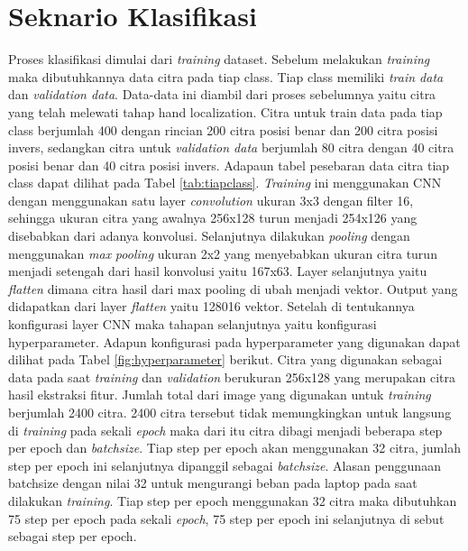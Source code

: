 \section{Seknario Klasifikasi}
Proses klasifikasi dimulai dari \emph{training} dataset. Sebelum melakukan \emph{training} maka dibutuhkannya data citra pada tiap class. Tiap class memiliki \emph{train data} dan \emph{validation data}. Data-data ini diambil dari proses sebelumnya yaitu citra yang telah melewati tahap hand localization. Citra untuk train data pada tiap class berjumlah 400 dengan rincian 200 citra posisi benar dan 200 citra posisi invers, sedangkan citra untuk \emph{validation data} berjumlah 80 citra dengan 40 citra posisi benar dan 40 citra posisi invers. Adapaun tabel pesebaran data citra tiap class dapat dilihat pada Tabel \ref{tab:tiapclass}. \emph{Training} ini menggunakan CNN dengan menggunakan satu layer \emph{convolution} ukuran 3x3 dengan filter 16, sehingga ukuran citra yang awalnya 256x128 turun menjadi 254x126 yang disebabkan dari adanya konvolusi. Selanjutnya dilakukan \emph{pooling} dengan menggunakan \emph{max} \emph{pooling} ukuran 2x2 yang menyebabkan ukuran citra turun menjadi setengah dari hasil konvolusi yaitu 167x63. Layer selanjutnya yaitu \emph{flatten} dimana citra hasil dari max pooling di ubah menjadi vektor. Output yang didapatkan dari layer \emph{flatten} yaitu 128016 vektor.  Setelah di tentukannya konfigurasi layer CNN maka tahapan selanjutnya yaitu konfigurasi hyperparameter. Adapun konfigurasi pada hyperparameter yang digunakan dapat dilihat pada Tabel \ref{fig:hyperparameter} berikut. Citra yang digunakan sebagai data pada saat \emph{training} dan \emph{validation} berukuran 256x128 yang merupakan citra hasil ekstraksi fitur. Jumlah total dari image yang digunakan untuk \emph{training} berjumlah 2400 citra. 2400 citra tersebut tidak memungkingkan untuk langsung di \emph{training} pada sekali \emph{epoch} maka dari itu citra dibagi menjadi beberapa step per epoch dan \emph{batchsize}. Tiap step per epoch akan menggunakan 32 citra, jumlah step per epoch ini selanjutnya dipanggil sebagai \emph{batchsize}. Alasan penggunaan batchsize dengan nilai 32 untuk mengurangi beban pada laptop pada saat dilakukan \emph{training}. Tiap step per epoch menggunakan 32 citra maka dibutuhkan 75 step per epoch pada sekali \emph{epoch}, 75 step per epoch ini selanjutnya di sebut sebagai step per epoch.

